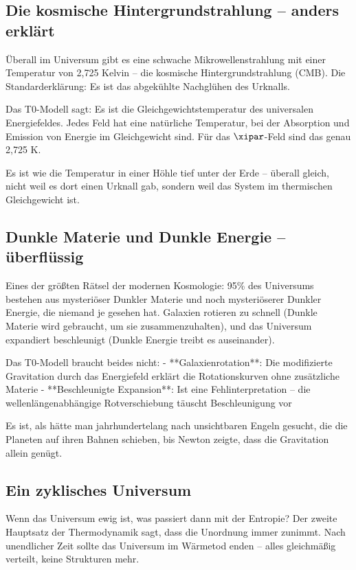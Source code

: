 	\subsection{Die kosmische Hintergrundstrahlung -- anders erklärt}
	
	Überall im Universum gibt es eine schwache Mikrowellenstrahlung mit einer Temperatur von 2,725 Kelvin -- die kosmische Hintergrundstrahlung (CMB). Die Standarderklärung: Es ist das abgekühlte Nachglühen des Urknalls.
	
	Das T0-Modell sagt: Es ist die Gleichgewichtstemperatur des universalen Energiefeldes. Jedes Feld hat eine natürliche Temperatur, bei der Absorption und Emission von Energie im Gleichgewicht sind. Für das $\xipar$-Feld sind das genau 2,725 K.
	
	Es ist wie die Temperatur in einer Höhle tief unter der Erde -- überall gleich, nicht weil es dort einen Urknall gab, sondern weil das System im thermischen Gleichgewicht ist.
	
	\subsection{Dunkle Materie und Dunkle Energie -- überflüssig}
	
	Eines der größten Rätsel der modernen Kosmologie: 95\% des Universums bestehen aus mysteriöser Dunkler Materie und noch mysteriöserer Dunkler Energie, die niemand je gesehen hat. Galaxien rotieren zu schnell (Dunkle Materie wird gebraucht, um sie zusammenzuhalten), und das Universum expandiert beschleunigt (Dunkle Energie treibt es auseinander).
	
	Das T0-Modell braucht beides nicht:
	- **Galaxienrotation**: Die modifizierte Gravitation durch das Energiefeld erklärt die Rotationskurven ohne zusätzliche Materie
	- **Beschleunigte Expansion**: Ist eine Fehlinterpretation -- die wellenlängenabhängige Rotverschiebung täuscht Beschleunigung vor
	
	Es ist, als hätte man jahrhundertelang nach unsichtbaren Engeln gesucht, die die Planeten auf ihren Bahnen schieben, bis Newton zeigte, dass die Gravitation allein genügt.
	
	\subsection{Ein zyklisches Universum}
	
	Wenn das Universum ewig ist, was passiert dann mit der Entropie? Der zweite Hauptsatz der Thermodynamik sagt, dass die Unordnung immer zunimmt. Nach unendlicher Zeit sollte das Universum im Wärmetod enden -- alles gleichmäßig verteilt, keine Strukturen mehr.
	
